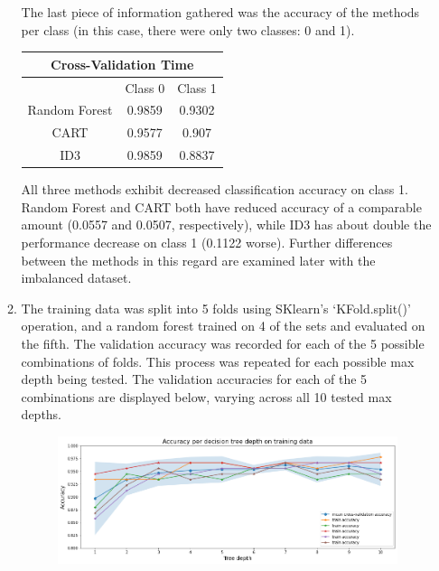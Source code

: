 \documentclass{article}
\begin{document}
\begin{enumerate}
\begin{enumerate}
		The last piece of information gathered was the accuracy of the methods per class (in this case, there were only two classes: 0 and 1).
		\begin{center}
                        \begin{tabular}{|c|c|c|}
                                \hline
                                \multicolumn{3}{|c|}{Cross-Validation Time} \\
                                \hline
                                & Class 0 & Class 1 \\
                                \hline
				Random Forest & 0.9859 & 0.9302 \\
				CART & 0.9577 & 0.907 \\
				ID3 & 0.9859 & 0.8837 \\
                                \hline
                        \end{tabular}
                \end{center}
		All three methods exhibit decreased classification accuracy on class 1. Random Forest and CART both have reduced accuracy of a comparable amount (0.0557 and 0.0507, respectively), while ID3 has about double the performance decrease on class 1 (0.1122 worse). Further differences between the methods in this regard are examined later with the imbalanced dataset.

	\item
		The training data was split into 5 folds using SKlearn's `KFold.split()' operation, and a random forest trained on 4 of the sets and evaluated on the fifth. The validation accuracy was recorded for each of the 5 possible combinations of folds. This process was repeated for each possible max depth being tested. The validation accuracies for each of the 5 combinations are displayed below, varying across all 10 tested max depths.
	\begin{figure}[H]
                \centering
        	\includegraphics[scale=0.5]{img/acc_depths.png}
        \end{figure}


\end{enumerate}
\end{enumerate}
\end{document}
